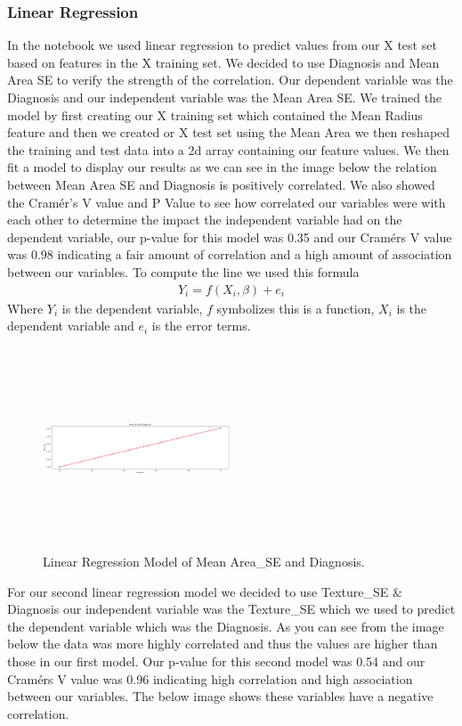 \documentclass[conference]{IEEEtran}
\begin{document}
\subsubsection{Linear Regression}
In the notebook we used linear regression to predict values from our X test set based on features in the X training set.  We decided to use Diagnosis and Mean Area SE to verify the strength of the correlation.  Our dependent variable was the Diagnosis and our independent variable was the Mean Area SE.   We trained the model by first creating our X training set which contained the Mean Radius feature and then we created or X test set using the Mean Area we then reshaped the training and test data into a 2d array containing our feature values.  We then fit a model to display our results as we can see in the image below the relation between Mean Area SE and Diagnosis is positively correlated.  We also showed the Cramér's V value and P Value to see how correlated our variables were with each other to determine the impact the independent variable had on the dependent variable, our p-value for this model was 0.35 and our Cramérs V value was 0.98 indicating a fair amount of correlation and a high amount of association between our variables.  To compute the line we used this formula 
\begin{multline}
    Y_i = f(X_i,\beta) + e_i
\end{multline}
Where $Y_i$ is the dependent variable, $f$ symbolizes this is a function, $X_i$ is the dependent variable and $e_i$ is the error terms.
\
\begin{figure}[H]
\caption{Linear Regression Model of Mean Area\_SE and Diagnosis.}
\centering
\includegraphics[height=60mm,width=0.5\textwidth]{Images/area_diagnosis.png}
\end{figure}
For our second linear regression model we decided to use Texture\_SE \& Diagnosis our independent variable was the Texture\_SE  which we used to predict the dependent variable which was the Diagnosis.  As you can see from the image below the data was more highly correlated and thus the values are higher than those in our first model.  Our p-value for this second model was 0.54 and our Cramérs V value was 0.96 indicating high correlation and high association between our variables.  The below image shows these variables have a negative correlation.
\end{document}
